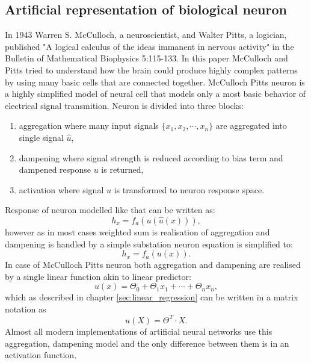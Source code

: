 \subsection{Artificial representation of biological neuron}
\FloatBarrier
In 1943 Warren S. McCulloch, a neuroscientist, and Walter Pitts, a logician, 
published "A logical calculus of the ideas immanent in nervous activity" in the 
Bulletin of Mathematical Biophysics 5:115-133. In this paper McCulloch and Pitts tried to
understand how the brain could produce highly complex patterns by using many basic cells
that are connected together. 
McCulloch Pitts neuron is a highly simplified model of neural cell that models only a most
basic behavior of electrical signal transmition.
Neuron is divided into three blocks:
\begin{enumerate}
	\item aggregation where many input signals $\{x_{1}, x_{2}, \cdots, x_{n}\}$ are 
		aggregated into single signal $\hat{u}$,
	\item dampening where signal strength is reduced according to bias term and dampened 
		response $u$ is returned,
	\item activation where signal $u$ is transformed to neuron response space.
\end{enumerate}
Response of neuron modelled like that can be written as:
\begin{equation}
	\label{equ:neuron_response}
	h_{x} = f_{a}(u(\hat{u}(x))),
\end{equation}
however as in most cases weighted sum is realisation of aggregation and dampening is handled by
a simple substation neuron equation is simplified to: 
\begin{equation}
	\label{equ:neuron_response}
	h_{x} = f_{a}(u(x)).
\end{equation}
In case of McCulloch Pitts neuron both aggregation and dampening are realised by a single 
linear function akin to linear predictor:
\begin{equation}
	\label{equ:linear_neuron}
	u(x) = \Theta_{0} + \Theta_{1}x_{1} + \cdots + \Theta_{n}x_{n},
\end{equation}
which as described in chapter \ref{sec:linear_regression} can be written in a matrix notation as
\begin{equation}
	\label{equ:linear_neuron_matrix}
	u(X) = \Theta^{T}\cdot X.
\end{equation}
Almost all modern implementations of artificial neural networks use this aggregation, dampening
model and the only difference between them is in an activation function.
